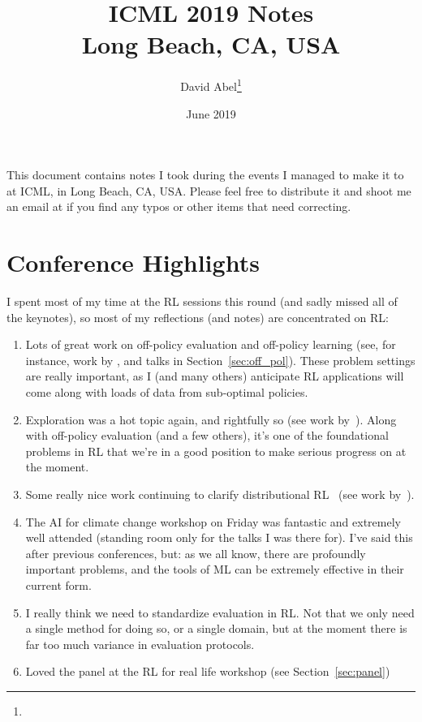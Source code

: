 \documentclass[11pt]{article}
\title{ICML 2019 Notes \\ \Large{Long Beach, CA, USA}}
\author{David Abel\footnote{\durl{http://david-abel.github.io}} \\ \durl{david_abel@brown.edu}}
\date{June 2019}
\begin{document}
\maketitle
\tableofcontents
\newpage


This document contains notes I took during the events I managed to make it to at ICML, in Long Beach, CA, USA. Please feel free to distribute it and shoot me an email at  if you find any typos or other items that need correcting. 


\section{Conference Highlights}


I spent most of my time at the RL sessions this round (and sadly missed all of the keynotes), so most of my reflections (and notes) are concentrated on RL:
\begin{enumerate}
    \item Lots of great work on off-policy evaluation and off-policy learning (see, for instance, work by \citet{hanna2018importance,le2019batch,fujimoto2018off,gottesman2019combining}, and talks in Section~\ref{sec:off_pol}). These problem settings are really important, as I (and many others) anticipate RL applications will come along with loads of data from sub-optimal policies.
    
    \item Exploration was a hot topic again, and rightfully so (see work by~\citet{mavrin2019distributional,fatemi2019dead,hazan2018provably,shani2019exploration}). Along with off-policy evaluation (and a few others), it's one of the foundational problems in RL that we're in a good position to make serious progress on at the moment.
    
    \item Some really nice work continuing to clarify distributional RL~\cite{bellemare2017distributional} (see work by~\cite{rowland2019statistics,mavrin2019distributional,qu2018nonlinear}).
    
    \item The AI for climate change workshop on Friday was fantastic and extremely well attended (standing room only for the talks I was there for). I've said this after previous conferences, but: as we all know, there are profoundly important problems, and the tools of ML can be extremely effective in their current form.
    
    \item I really think we need to standardize evaluation in RL. Not that we only need a single method for doing so, or a single domain, but at the moment there is far too much variance in evaluation protocols.
    
    \item Loved the panel at the RL for real life workshop (see Section~\ref{sec:panel})
\end{enumerate}
\end{document}
